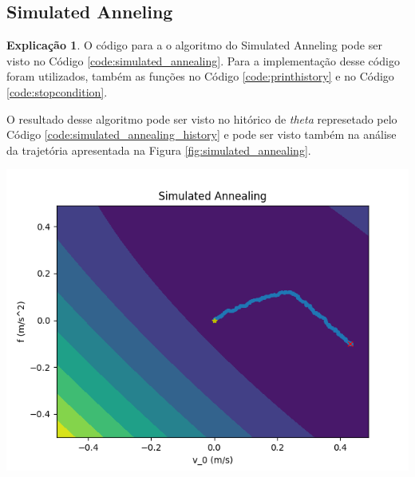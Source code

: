 \documentclass[a4paper, 9pt]{article}
\newenvironment{Figure}
  {\par\medskip\noindent\minipage{\linewidth}}
  {\endminipage\par\medskip}
\theoremstyle{plain}
\theoremstyle{definition}
\newtheorem{explanation}{Explicação}
\theoremstyle{definition}
\theoremstyle{definition}
\begin{document}
\begin{multicols}{2}
\section*{Simulated Anneling}

\begin{explanation}
    O código para a o algoritmo do Simulated Anneling pode ser visto no Código \ref{code:simulated_annealing}. Para a implementação desse código foram utilizados, também as funções no Código \ref{code:printhistory} e no Código \ref{code:stopcondition}.

    O resultado desse algoritmo pode ser visto no hitórico de \textit{theta} represetado pelo Código \ref{code:simulated_annealing_history} e pode ser visto também na análise da trajetória apresentada na Figura \ref{fig:simulated_annealing}.
\end{explanation}




\begin{Figure}
    \centering
    \includegraphics[width=\linewidth]
    {./../code/simulated_annealing.png}
    \label{fig:simulated_annealing}
\end{Figure}


\end{multicols}
\end{document}
